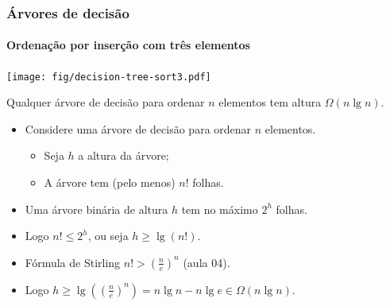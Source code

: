 \documentclass{beamer}
\begin{document}
\begin{frame}

  \frametitle{Árvores de decisão}
  \framesubtitle{Ordenação por inserção com três elementos}

  \begin{center}
    \texttt{[image: fig/decision-tree-sort3.pdf]}
  \end{center}

\end{frame}

\begin{frame}

\begin{theorem}
\label{thm:sort}
  Qualquer árvore de decisão para ordenar $n$ elementos tem altura $\Omega(n \lg n)$.
\end{theorem}
\pause
\begin{itemize}
\item Considere uma árvore de decisão para ordenar $n$ elementos.
\begin{itemize}
  \item Seja $h$ a altura da árvore;
  \item A árvore tem (pelo menos) $n!$ folhas.
\end{itemize}
\pause
\item Uma árvore binária de altura $h$ tem no máximo $2^h$ folhas.
\pause
\item Logo $n! \le 2^h$, ou seja $h \ge \lg(n!)$.
\pause
\item Fórmula de Stirling $n! > \left(\frac{n}{e}\right)^n$ (aula 04).
\item Logo $h \ge \lg( (\frac{n}{e})^n ) = n \lg n - n \lg e \in \Omega(n \lg n)$.
\end{itemize}
\end{frame}
\end{document}
